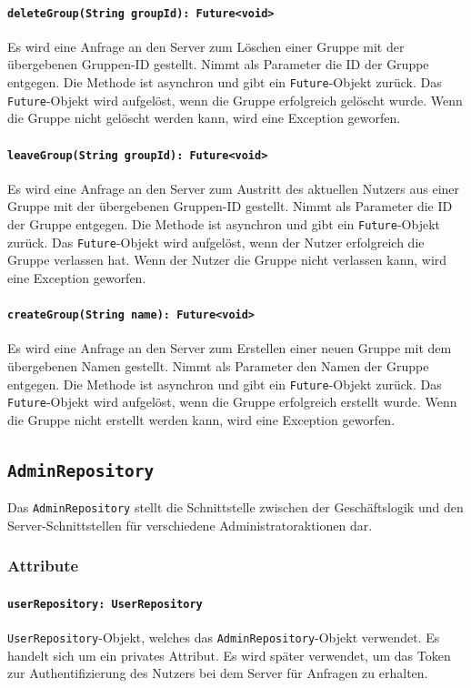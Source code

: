 \documentclass{entwurfsheft}
\begin{document}
\paragraph{\texttt{deleteGroup(String groupId): Future<void>}}
Es wird eine Anfrage an den Server zum Löschen einer Gruppe mit der übergebenen Gruppen-ID gestellt. Nimmt als Parameter die ID der Gruppe entgegen. Die Methode ist asynchron und gibt ein \texttt{Future}-Objekt zurück. Das \texttt{Future}-Objekt wird aufgelöst, wenn die Gruppe erfolgreich gelöscht wurde. Wenn die Gruppe nicht gelöscht werden kann, wird eine Exception geworfen.
\paragraph{\texttt{leaveGroup(String groupId): Future<void>}}
Es wird eine Anfrage an den Server zum Austritt des aktuellen Nutzers aus einer Gruppe mit der übergebenen Gruppen-ID gestellt. Nimmt als Parameter die ID der Gruppe entgegen. Die Methode ist asynchron und gibt ein \texttt{Future}-Objekt zurück. Das \texttt{Future}-Objekt wird aufgelöst, wenn der Nutzer erfolgreich die Gruppe verlassen hat. Wenn der Nutzer die Gruppe nicht verlassen kann, wird eine Exception geworfen.
\paragraph{\texttt{createGroup(String name): Future<void>}}
Es wird eine Anfrage an den Server zum Erstellen einer neuen Gruppe mit dem übergebenen Namen gestellt. Nimmt als Parameter den Namen der Gruppe entgegen. Die Methode ist asynchron und gibt ein \texttt{Future}-Objekt zurück. Das \texttt{Future}-Objekt wird aufgelöst, wenn die Gruppe erfolgreich erstellt wurde. Wenn die Gruppe nicht erstellt werden kann, wird eine Exception geworfen.

\newpage
\subsection{\texttt{AdminRepository}}\label{sec:AdminRepository}
Das \texttt{AdminRepository} stellt die Schnittstelle zwischen der Geschäftslogik und den Server-Schnittstellen für verschiedene Administratoraktionen dar.
\subsubsection*{Attribute}
\paragraph{\texttt{userRepository: UserRepository}}
\texttt{UserRepository}-Objekt, welches das \texttt{AdminRepository}-Objekt verwendet. Es handelt sich um ein privates Attribut. Es wird später verwendet, um das Token zur Authentifizierung des Nutzers bei dem Server für Anfragen zu erhalten.
\end{document}
